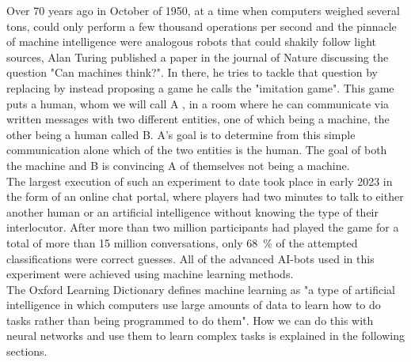 Over 70 years ago in October of 1950, at a time when computers weighed several tons, could only perform a few thousand operations per second and the pinnacle of machine intelligence were analogous robots that could shakily follow light sources\cite{FirstThinkingMachinesArticle}, Alan Turing published a paper in the journal of Nature discussing the question "Can machines think?"\cite{TuringThinkingPaper}. In there, he tries to tackle that question by replacing by instead proposing a game he calls the "imitation game". This game puts a human, whom we will call A , in a room where he can communicate via written messages with two different entities, one of which being a machine, the other being a human called B. A's goal is to determine from this simple communication alone which of the two entities is the human. The goal of both the machine and B is convincing A of themselves not being a machine.\\
The largest execution of such an experiment to date took place in early 2023 in the form of an online chat portal, where players had two minutes to talk to either another human or an artificial intelligence without knowing the type of their interlocutor. After more than two million participants had played the game for a total of more than 15 million conversations, only \SI{68}{\percent} of the attempted classifications were correct guesses. All of the advanced AI-bots used in this experiment were achieved using machine learning methods.\\
The Oxford Learning Dictionary defines machine learning as "a type of artificial intelligence in which computers use large amounts of data to learn how to do tasks rather than being programmed to do them"\cite{MLDefinition}. How we can do this with neural networks and use them to learn complex tasks is explained in the following sections.

